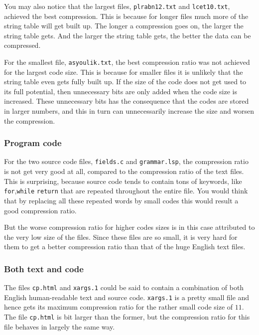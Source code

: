 You may also notice that the largest files, \verb|plrabn12.txt| and
\verb|lcet10.txt|, achieved the best compression. This is because for
longer files much more of the string table will get built up. The
longer a compression goes on, the larger the string table gets. And
the larger the string table gets, the better the data can be
compressed.

For the smallest file, \verb|asyoulik.txt|, the best compression ratio
was not achieved for the largest code size. This is because for
smaller files it is unlikely that the string table even gets fully
built up. If the size of the code does not get used to its full
potential, then unnecessary bits are only added when the code size is
increased. These unnecessary bits has the consequence that the codes
are stored in larger numbers, and this in turn can unnecessarily
increase the size and worsen the compression.

\subsubsection{Program code}

For the two source code files, \verb|fields.c| and \verb|grammar.lsp|,
the compression ratio is not get very good at all, compared to the
compression ratio of the text files. This is surprising, because
source code tends to contain tons of keywords, like
\verb|for|,\verb|while| \verb|return| that are repeated throughout the
entire file. You would think that by replacing all these repeated words by
small codes this would result a good compression ratio.

But the worse compression ratio for higher codes sizes is in this case
attributed to the very low size of the files. Since these files are so
small, it is very hard for them to get a better compression ratio than
that of the huge English text files.

\subsubsection{Both text and code}

The files \verb|cp.html| and \verb|xargs.1| could be said to contain a
combination of both English human-readable text and source
code. \verb|xargs.1| is a pretty small file and hence gets its maximum
compression ratio for the rather small code size of $11$. The file
\verb|cp.html| is bit larger than the former, but the compression
ratio for this file behaves in largely the same way.


